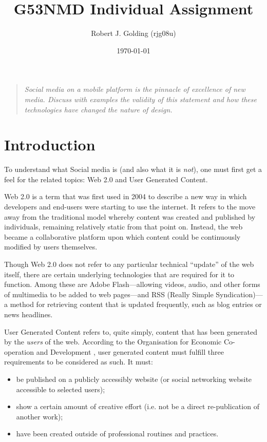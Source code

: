 \documentclass[a4paper,11pt]{article}
\title{G53NMD Individual Assignment}
\author{Robert J. Golding (rjg08u)} \date{\today}
\begin{document}
    \maketitle

    \begin{quote}
        \emph{Social media on a mobile platform is the pinnacle of excellence
        of new media. Discuss with examples the validity of this statement and
        how these technologies have changed the nature of design.}
    \end{quote}

    \section{Introduction}

    To understand what Social media is (and also what it is \emph{not}), one
    must first get a feel for the related topics: Web 2.0 and User Generated
    Content. \cite{kaplan2010}

    Web 2.0 is a term that was first used in 2004 to describe a new way in
    which developers and end-users were starting to use the internet. It refers
    to the move away from the traditional model whereby content was created and
    published by individuals, remaining relatively static from that point on.
    Instead, the web became a collaborative platform upon which content could
    be continuously modified by users themselves.

    Though Web 2.0 does not refer to any particular technical ``update'' of the
    web itself, there are certain underlying technologies that are required for
    it to function. Among these are Adobe Flash---allowing videos, audio, and
    other forms of multimedia to be added to web pages---and RSS (Really Simple
    Syndication)---a method for retrieving content that is updated frequently,
    such as blog entries or news headlines.

    User Generated Content refers to, quite simply, content that has been
    generated by the \emph{users} of the web. According to the Organisation for
    Economic Co-operation and Development \cite{vickery2007}, user generated
    content must fulfill three requirements to be considered as such. It must:

    \begin{itemize}
        \item be published on a publicly accessibly website (or social
            networking website accessible to selected users);
        \item show a certain amount of creative effort (i.e. not be a direct
            re-publication of another work);
        \item have been created outside of professional routines and practices.
    \end{itemize}
\end{document}
